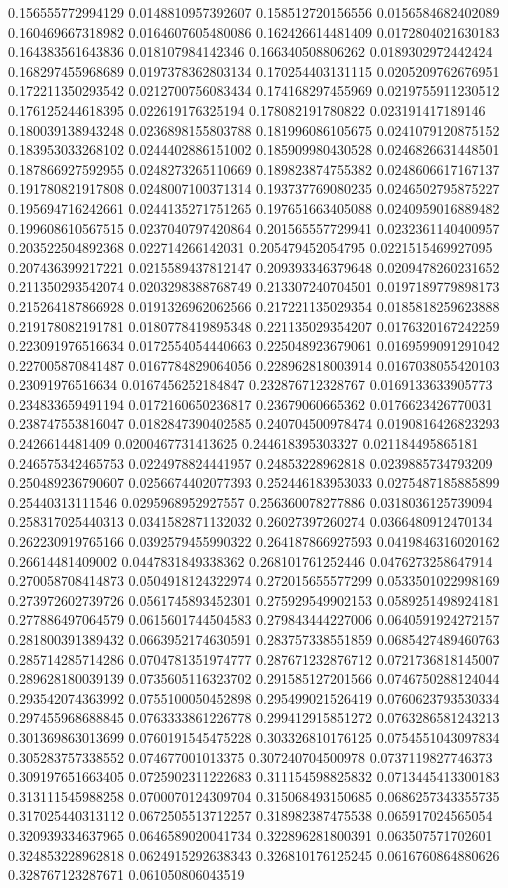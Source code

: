 \begin{table}
\begin{tabu}
\begin{sparkline}{10}
0.156555772994129 0.0148810957392607 0.158512720156556 0.0156584682402089 0.160469667318982 0.0164607605480086 0.162426614481409 0.0172804021630183 0.164383561643836 0.018107984142346 0.166340508806262 0.0189302972442424 0.168297455968689 0.0197378362803134 0.170254403131115 0.0205209762676951 0.172211350293542 0.0212700756083434 0.174168297455969 0.0219755911230512 0.176125244618395 0.022619176325194 0.178082191780822 0.023191417189146 0.180039138943248 0.0236898155803788 0.181996086105675 0.0241079120875152 0.183953033268102 0.0244402886151002 0.185909980430528 0.0246826631448501 0.187866927592955 0.0248273265110669 0.189823874755382 0.0248606617167137 0.191780821917808 0.0248007100371314 0.193737769080235 0.0246502795875227 0.195694716242661 0.0244135271751265 0.197651663405088 0.0240959016889482 0.199608610567515 0.0237040797420864 0.201565557729941 0.0232361140400957 0.203522504892368 0.022714266142031 0.205479452054795 0.0221515469927095 0.207436399217221 0.0215589437812147 0.209393346379648 0.0209478260231652 0.211350293542074 0.0203298388768749 0.213307240704501 0.0197189779898173 0.215264187866928 0.0191326962062566 0.217221135029354 0.0185818259623888 0.219178082191781 0.0180778419895348 0.221135029354207 0.0176320167242259 0.223091976516634 0.0172554054440663 0.225048923679061 0.0169599091291042 0.227005870841487 0.0167784829064056 0.228962818003914 0.0167038055420103 0.23091976516634 0.0167456252184847 0.232876712328767 0.0169133633905773 0.234833659491194 0.0172160650236817 0.23679060665362 0.0176623426770031 0.238747553816047 0.0182847390402585 0.240704500978474 0.0190816426823293 0.2426614481409 0.0200467731413625 0.244618395303327 0.021184495865181 0.246575342465753 0.0224978824441957 0.24853228962818 0.0239885734793209 0.250489236790607 0.0256674402077393 0.252446183953033 0.0275487185885899 0.25440313111546 0.0295968952927557 0.256360078277886 0.0318036125739094 0.258317025440313 0.0341582871132032 0.26027397260274 0.0366480912470134 0.262230919765166 0.0392579455990322 0.264187866927593 0.0419846316020162 0.26614481409002 0.0447831849338362 0.268101761252446 0.0476273258647914 0.270058708414873 0.0504918124322974 0.272015655577299 0.0533501022998169 0.273972602739726 0.0561745893452301 0.275929549902153 0.0589251498924181 0.277886497064579 0.0615601744504583 0.279843444227006 0.0640591924272157 0.281800391389432 0.0663952174630591 0.283757338551859 0.0685427489460763 0.285714285714286 0.0704781351974777 0.287671232876712 0.0721736818145007 0.289628180039139 0.0735605116323702 0.291585127201566 0.0746750288124044 0.293542074363992 0.0755100050452898 0.295499021526419 0.0760623793530334 0.297455968688845 0.0763333861226778 0.299412915851272 0.0763286581243213 0.301369863013699 0.0760191545475228 0.303326810176125 0.0754551043097834 0.305283757338552 0.074677001013375 0.307240704500978 0.0737119827746373 0.309197651663405 0.0725902311222683 0.311154598825832 0.0713445413300183 0.313111545988258 0.0700070124309704 0.315068493150685 0.0686257343355735 0.317025440313112 0.0672505513712257 0.318982387475538 0.065917024565054 0.320939334637965 0.0646589020041734 0.322896281800391 0.063507571702601 0.324853228962818 0.0624915292638343 0.326810176125245 0.0616760864880626 0.328767123287671 0.061050806043519 
\end{sparkline}
\end{tabu}
\end{table}
